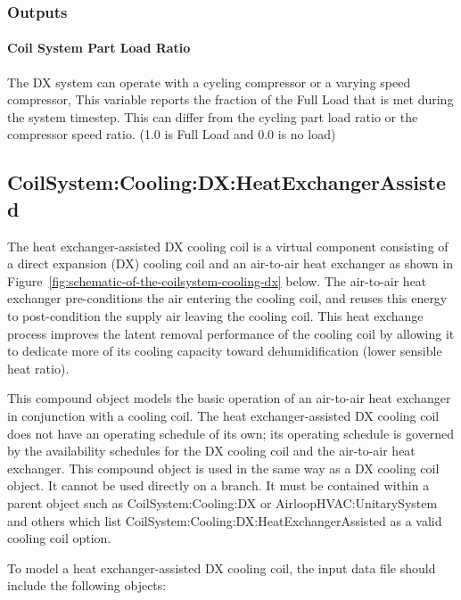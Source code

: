 \subsubsection{Outputs}\label{outputs-20}

\paragraph{Coil System Part Load Ratio}\label{coil-system-part-load-ratio-1}

The DX system can operate with a cycling compressor or a varying speed compressor, This variable reports the fraction of the Full Load that is met during the system timestep. This can differ from the cycling part load ratio or the compressor speed ratio. (1.0 is Full Load and 0.0 is no load)

\subsection{CoilSystem:Cooling:DX:HeatExchangerAssisted}\label{coilsystemcoolingdxheatexchangerassisted}

The heat exchanger-assisted DX cooling coil is a virtual component consisting of a direct expansion (DX) cooling coil and an air-to-air heat exchanger as shown in Figure~\ref{fig:schematic-of-the-coilsystem-cooling-dx} below. The air-to-air heat exchanger pre-conditions the air entering the cooling coil, and reuses this energy to post-condition the supply air leaving the cooling coil. This heat exchange process improves the latent removal performance of the cooling coil by allowing it to dedicate more of its cooling capacity toward dehumidification (lower sensible heat ratio).

This compound object models the basic operation of an air-to-air heat exchanger in conjunction with a cooling coil. The heat exchanger-assisted DX cooling coil does not have an operating schedule of its own; its operating schedule is governed by the availability schedules for the DX cooling coil and the air-to-air heat exchanger. This compound object is used in the same way as a DX cooling coil object. It cannot be used directly on a branch. It must be contained within a parent object such as CoilSystem:Cooling:DX or AirloopHVAC:UnitarySystem and others which list CoilSystem:Cooling:DX:HeatExchangerAssisted as a valid cooling coil option.

To model a heat exchanger-assisted DX cooling coil, the input data file should include the following objects:

